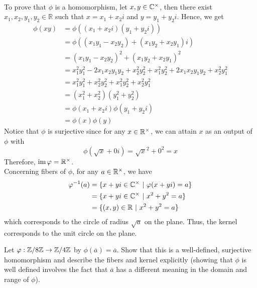 \begin{solution}
    \\ To prove that $\phi$ is a homomorphism, let $x,y \in \mathbb{C}^{\times}$, then there exist $x_1,x_2,y_1,y_2 \in \mathbb{R}$ such that $x = x_1 + x_2 i$ and $y = y_1 + y_2 i$. Hence, we get 
    \begin{align*}
        \phi(xy) &= \phi((x_1 + x_2 i)(y_1 + y_2i)) \\
        &= \phi((x_1 y_1 - x_2 y_2) + (x_1 y_2 + x_2 y_1)i) \\
        &= (x_1 y_1 - x_2 y_2)^2 + (x_1 y_2 + x_2 y_1)^2 \\
        &= x_1^2 y_1^2 - 2x_1x_2y_1y_2 + x_2^2y_2^2 + x_1^2 y_2^2 + 2x_1x_2y_1y_2 + x_2^2y_1^2 \\
        &= x_1^2 y_1^2  + x_2^2y_2^2 + x_1^2 y_2^2 + x_2^2y_1^2 \\
        &= (x_1^2 + x_2^2)(y_1^2 + y_2^2) \\
        &= \phi(x_1 + x_2 i) \phi(y_1 + y_2 i) \\
        &=  \phi(x)\phi(y)
    \end{align*}
    Notice that $\phi$ is surjective since for any $x \in \mathbb{R}^{\times}$, we can attain $x$ as an output of $\phi$ with 
    $$\phi(\sqrt{x} + 0i) = \sqrt{x}^2 + 0^2 = x$$
    Therefore, $\operatorname{im} \varphi = \mathbb{R}^{\times}$. \\
    Concerning fibers of $\phi$, for any $a \in \mathbb{R}^{\times}$, we have 
    \begin{align*}
        \varphi^{-1}(a) &= \{ x + yi \in \mathbb{C}^{\times} \ | \ \varphi(x + yi) = a\} \\
        &= \{ x + yi \in \mathbb{C}^{\times} \ | \ x^2 + y^2 = a\} \\
        &= \{ (x,y)\in\mathbb{R} \ | \ x^2 + y^2 = a\}
    \end{align*}
    which corresponds to the circle of radius $\sqrt{a}$ on the plane. Thus, the kernel corresponds to the unit circle on the plane. \\ 
\end{solution}

\begin{exercise}
    Let $\varphi : \mathbb{Z} / 8 \mathbb{Z} \to \mathbb{Z} / 4 \mathbb{Z}$ by $\phi(\overline{a}) = \overline{a}$. Show that this is a well-defined, surjective homomorphism and describe the fibers and kernel explicitly (showing that $\phi$ is well defined involves the fact that $\overline{a}$ has a different meaning in the domain and range of $\phi$).\\
\end{exercise}

